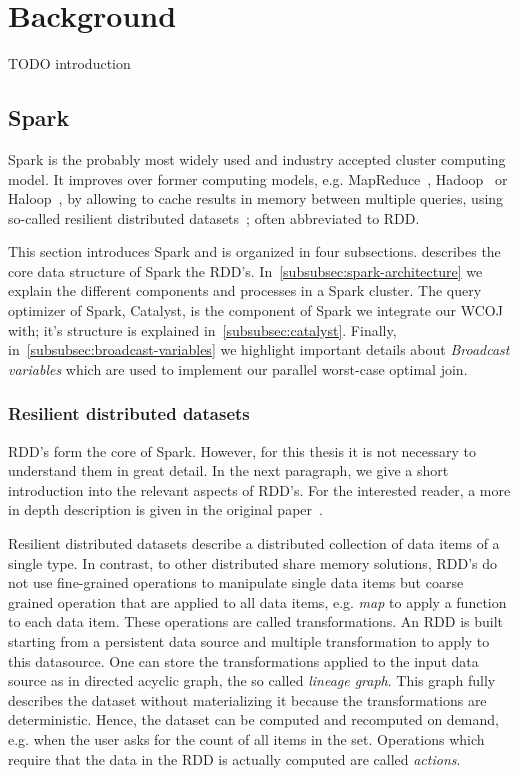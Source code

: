 \section{Background}\label{sec:background}

TODO introduction
\subsection{Spark}\label{subsec:spark}
Spark is the probably most widely used and industry accepted cluster computing model.
It improves over former computing models, e.g. MapReduce~\cite{mapreduce}, Hadoop~\cite{hadoop} or Haloop~\cite{haloop},
by allowing to cache results in memory between multiple queries, using so-called resilient
distributed datasets~\cite{rdd}; often abbreviated to RDD.

This section introduces Spark and is organized in four subsections.
 describes the core data structure of Spark the RDD's.
In~\cref{subsubsec:spark-architecture} we explain the different components and processes in a Spark cluster.
The query optimizer of Spark, Catalyst, is the component of Spark we integrate our \textsc{WCOJ} with; it's structure is explained
in~\cref{subsubsec:catalyst}.
Finally, in~\cref{subsubsec:broadcast-variables} we highlight important details about \textit{Broadcast variables} which are used
to implement our parallel worst-case optimal join.

\subsubsection{Resilient distributed datasets} \label{subsubsec:resilient-distributed-datasets}
RDD's form the core of Spark.
However, for this thesis it is not necessary to understand them in great detail.
In the next paragraph, we give a short introduction into the relevant aspects of RDD's.
For the interested reader, a more in depth description is given in the original paper~\cite{rdd}.

Resilient distributed datasets describe a distributed collection of data items of a single type.
In contrast, to other distributed share memory solutions, RDD's do not use fine-grained
operations to manipulate single data items but coarse grained operation that are applied
to all data items, e.g. \textit{map} to apply a function to each data item.
These operations are called transformations.
An RDD is built starting from a persistent data source and multiple transformation to
apply to this datasource.
One can store the transformations applied to the input data source as in directed acyclic graph, the so called \textit{lineage graph}.
This graph fully describes the dataset without materializing it because the transformations are deterministic.
Hence, the dataset can be computed and recomputed on demand, e.g. when the user asks for the count
of all items in the set.
Operations which require that the data in the RDD is actually computed are called \textit{actions}.

